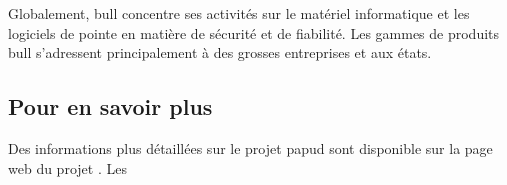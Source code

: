 Globalement, \gls{bull} concentre ses activités sur le matériel informatique et les logiciels de pointe en matière de sécurité et de fiabilité.
Les gammes de produits \gls{bull} s'adressent principalement à des grosses entreprises et aux états.

\subsection*{Pour en savoir plus}
Des informations plus détaillées sur le projet \gls{papud} sont disponible sur la page web du projet \autocite{about_papud}.
Les %
